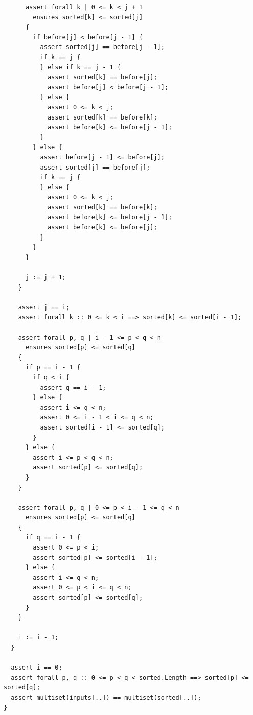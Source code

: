 \documentclass{article}
\begin{document}
\begin{lstlisting}
      assert forall k | 0 <= k < j + 1
        ensures sorted[k] <= sorted[j]
      {
        if before[j] < before[j - 1] {
          assert sorted[j] == before[j - 1];
          if k == j {
          } else if k == j - 1 {
            assert sorted[k] == before[j];
            assert before[j] < before[j - 1];
          } else {
            assert 0 <= k < j;
            assert sorted[k] == before[k];
            assert before[k] <= before[j - 1];
          }
        } else {
          assert before[j - 1] <= before[j];
          assert sorted[j] == before[j];
          if k == j {
          } else {
            assert 0 <= k < j;
            assert sorted[k] == before[k];
            assert before[k] <= before[j - 1];
            assert before[k] <= before[j];
          }
        }
      }

      j := j + 1;
    }

    assert j == i;
    assert forall k :: 0 <= k < i ==> sorted[k] <= sorted[i - 1];

    assert forall p, q | i - 1 <= p < q < n
      ensures sorted[p] <= sorted[q]
    {
      if p == i - 1 {
        if q < i {
          assert q == i - 1;
        } else {
          assert i <= q < n;
          assert 0 <= i - 1 < i <= q < n;
          assert sorted[i - 1] <= sorted[q];
        }
      } else {
        assert i <= p < q < n;
        assert sorted[p] <= sorted[q];
      }
    }

    assert forall p, q | 0 <= p < i - 1 <= q < n
      ensures sorted[p] <= sorted[q]
    {
      if q == i - 1 {
        assert 0 <= p < i;
        assert sorted[p] <= sorted[i - 1];
      } else {
        assert i <= q < n;
        assert 0 <= p < i <= q < n;
        assert sorted[p] <= sorted[q];
      }
    }

    i := i - 1;
  }

  assert i == 0;
  assert forall p, q :: 0 <= p < q < sorted.Length ==> sorted[p] <= sorted[q];
  assert multiset(inputs[..]) == multiset(sorted[..]);
}
\end{lstlisting}
\end{document}
